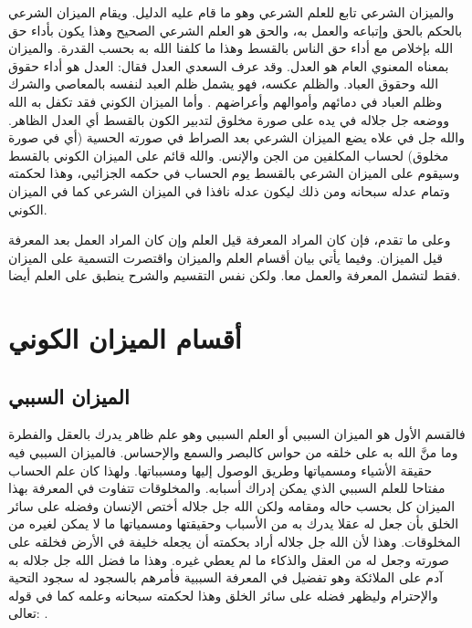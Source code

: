 والميزان الشرعي تابع للعلم الشرعي وهو ما قام عليه الدليل. ويقام الميزان الشرعي بالحكم بالحق وإتباعه والعمل به، والحق هو العلم الشرعي الصحيح وهذا يكون بأداء حق الله بإخلاص مع أداء حق الناس بالقسط وهذا ما كلفنا الله به بحسب القدرة. والميزان بمعناه المعنوي العام هو العدل. وقد عرف السعدي العدل فقال: العدل هو أداء حقوق الله وحقوق العباد. والظلم عكسه، فهو يشمل ظلم العبد لنفسه بالمعاصي والشرك وظلم العباد في دمائهم وأموالهم وأعراضهم \href{https://shamela.ws/book/42/2143#p13}{\faExternalLink} \cite{tafsir_Saadi}. وأما الميزان الكوني فقد تكفل به الله ووضعه جل جلاله في يده على صورة مخلوق لتدبير الكون بالقسط أي العدل الظاهر. والله جل في علاه يضع الميزان الشرعي بعد الصراط في صورته الحسية (أي في صورة مخلوق) لحساب المكلفين من الجن والإنس. والله قائم على الميزان الكوني بالقسط وسيقوم على الميزان الشرعي بالقسط يوم الحساب في حكمه الجزائيي، وهذا لحكمته وتمام عدله سبحانه ومن ذلك ليكون عدله نافذا في الميزان الشرعي كما في الميزان الكوني.

وعلى ما تقدم، فإن كان المراد المعرفة قيل العلم وإن كان المراد العمل بعد المعرفة قيل الميزان. وفيما يأتي بيان أقسام العلم والميزان واقتصرت التسمية على الميزان فقط لتشمل المعرفة والعمل معا. ولكن نفس التقسيم والشرح ينطبق على العلم أيضا.

\section{أقسام الميزان الكوني}

\subsection{الميزان السببي}

فالقسم الأول هو الميزان السببي أو العلم السببي وهو علم ظاهر يدرك بالعقل والفطرة وما منَّ الله به على خلقه من حواس كالبصر والسمع والإحساس. فالميزان السببي فيه حقيقة الأشياء ومسمياتها وطريق الوصول إليها ومسبباتها. ولهذا كان علم الحساب مفتاحا للعلم السببي الذي يمكن إدراك أسبابه. والمخلوقات تتفاوت في المعرفة بهذا الميزان كل بحسب حاله ومقامه ولكن الله جل جلاله أختص الإنسان وفضله على سائر الخلق بأن جعل له عقلا يدرك به من الأسباب وحقيقتها ومسمياتها ما لا يمكن لغيره من المخلوقات. وهذا لأن الله جل جلاله أراد بحكمته أن يجعله خليفة في الأرض فخلقه على صورته وجعل له من العقل والذكاء ما لم يعطي غيره. وهذا ما فضل الله جل جلاله به آدم على الملائكة وهو تفضيل في المعرفة السببية فأمرهم بالسجود له سجود التحية والإحترام وليظهر فضله على سائر الخلق وهذا لحكمته سبحانه وعلمه كما في قوله تعالى:
\quranayah*[2][30-34]{\footnotesize \surahname*[2]}.

